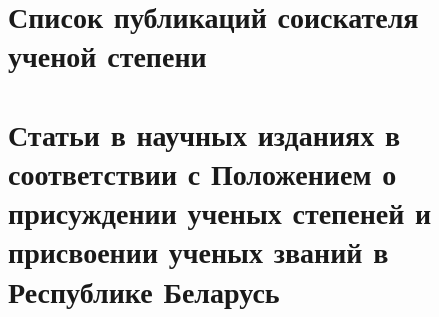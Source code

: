 






\newpage
\section*{Список публикаций соискателя ученой степени}

\renewcommand{\labelenumi}{\arabic{enumi}--A}
\renewcommand{\theenumi}{\arabic{enumi}--A}

\vspace{-4ex}
\section*{\fontsize{14}{15}\selectfont Статьи в научных изданиях в соответствии с Положением о присуждении ученых степеней и присвоении ученых званий в Республике Беларусь}
\vspace{-4ex}

